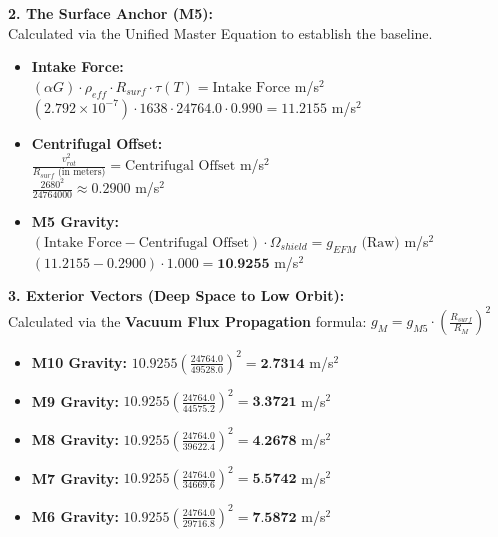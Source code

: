 \documentclass[11pt, a4paper]{article}
\begin{document}
  \vspace{1.0em}
  \noindent \textbf{2. The Surface Anchor (M5):} \\
  \hspace*{1em} Calculated via the Unified Master Equation to establish the baseline.
  \begin{itemize}
    \item \textbf{Intake Force:} \\[0.5em]
    \hspace*{2em} $(\alpha G) \cdot \rho_{eff} \cdot R_{surf} \cdot \tau(T) = \text{Intake Force}$ m/s$^2$ \\[1em]
    \hspace*{2em} $(2.792 \times 10^{-7}) \cdot 1638 \cdot 24764.0 \cdot 0.990 = 11.2155$ m/s$^2$
    
    \item \textbf{Centrifugal Offset:} \\[0.5em]
    \hspace*{2em} $\frac{v_{rot}^2}{R_{surf} \text{ (in meters)}} = \text{Centrifugal Offset}$ m/s$^2$ \\[1em]
    \hspace*{2em} $\frac{2680^2}{24764000} \approx 0.2900$ m/s$^2$
    
    \item \textbf{M5 Gravity:} \\[0.5em]
    \hspace*{2em} $(\text{Intake Force} - \text{Centrifugal Offset}) \cdot \Omega_{shield} = g_{EFM} \text{ (Raw)}$ m/s$^2$ \\[1em]
    \hspace*{2em} $(11.2155 - 0.2900) \cdot 1.000 = \textbf{10.9255}$ m/s$^2$
  \end{itemize}

  \clearpage
  \noindent \textbf{3. Exterior Vectors (Deep Space to Low Orbit):} \\
  \hspace*{1em} Calculated via the \textbf{Vacuum Flux Propagation} formula: $g_M = g_{M5} \cdot \left( \frac{R_{surf}}{R_M} \right)^2$
  \begin{itemize}
    \item \textbf{M10 Gravity:} $10.9255 \left( \frac{24764.0}{49528.0} \right)^2 = \textbf{2.7314}$ m/s$^2$
    \item \textbf{M9 Gravity:} $10.9255 \left( \frac{24764.0}{44575.2} \right)^2 = \textbf{3.3721}$ m/s$^2$
    \item \textbf{M8 Gravity:} $10.9255 \left( \frac{24764.0}{39622.4} \right)^2 = \textbf{4.2678}$ m/s$^2$
    \item \textbf{M7 Gravity:} $10.9255 \left( \frac{24764.0}{34669.6} \right)^2 = \textbf{5.5742}$ m/s$^2$
    \item \textbf{M6 Gravity:} $10.9255 \left( \frac{24764.0}{29716.8} \right)^2 = \textbf{7.5872}$ m/s$^2$
  \end{itemize}
\end{document}
